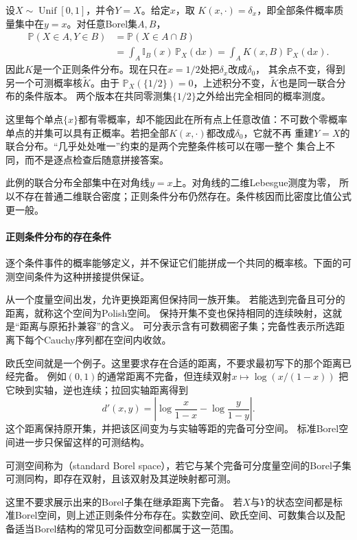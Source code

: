 \begin{example}[条件分布版本可以怎样不同]
\label{ex:probability-conditional-kernel-versions}
设\(X\sim\operatorname{Unif}[0,1]\)，并令\(Y=X\)。给定\(x\)，取
\(K(x,\cdot)=\delta_x\)，即全部条件概率质量集中在\(y=x\)。对任意Borel集\(A,B\)，
\[
 \begin{aligned}
 \mathbb P(X\in A,Y\in B)
 &=\mathbb P(X\in A\cap B)\\
 &=\int_A\mathbb I_B(x)\,\mathbb P_X(\mathrm dx)
  =\int_A K(x,B)\,\mathbb P_X(\mathrm dx).
 \end{aligned}
\]
因此\(K\)是一个正则条件分布。现在只在\(x=1/2\)处把\(\delta_x\)改成\(\delta_0\)，
其余点不变，得到另一个可测概率核\(\widetilde K\)。由于
\(\mathbb P_X(\{1/2\})=0\)，上述积分不变，\(\widetilde K\)也是同一联合分布的条件版本。
两个版本在共同零测集\(\{1/2\}\)之外给出完全相同的概率测度。

这里每个单点\(\{x\}\)都有零概率，却不能因此在所有点上任意改值：不可数个零概率
单点的并集可以具有正概率。若把全部\(K(x,\cdot)\)都改成\(\delta_0\)，它就不再
重建\(Y=X\)的联合分布。“几乎处处唯一”约束的是两个完整条件核可以在哪一整个
集合上不同，而不是逐点检查后随意拼接答案。

此例的联合分布全部集中在对角线\(y=x\)上。对角线的二维Lebesgue测度为零，
所以不存在普通二维联合密度；正则条件分布仍然存在。条件核因而比密度比值公式更一般。
\end{example}

\paragraph{正则条件分布的存在条件}
逐个条件事件的概率能够定义，并不保证它们能拼成一个共同的概率核。下面的可测空间条件为这种拼接提供保证。
\begin{definition}[Polish空间]
  \label{def:probability-polish-space}
从一个度量空间出发，允许更换距离但保持同一族开集。
若能选到完备且可分的距离，就称这个空间为Polish空间。
保持开集不变也保持相同的连续映射，这就是“距离与原拓扑兼容”的含义。
可分表示含有可数稠密子集；完备性表示所选距离下每个Cauchy序列都在空间内收敛。
\end{definition}
欧氏空间就是一个例子。这里要求存在合适的距离，不要求最初写下的那个距离已经完备。
例如\((0,1)\)的通常距离不完备，但连续双射\(x\mapsto\log(x/(1-x))\)
把它映到实轴，逆也连续；拉回实轴距离得到
\[
 d'(x,y)=\left|\log\frac{x}{1-x}-\log\frac{y}{1-y}\right|.
\]
这个距离保持原开集，并把该区间变为与实轴等距的完备可分空间。
标准Borel空间进一步只保留这样的可测结构。
\begin{definition}[标准Borel空间]
  \label{def:probability-standard-borel-space}
  可测空间称为（standard Borel space），若它与某个完备可分度量空间的Borel子集可测同构，即存在双射，且该双射及其逆映射都可测。
\end{definition}
这里不要求展示出来的Borel子集在继承距离下完备。
若\(X\)与\(Y\)的状态空间都是标准Borel空间，则上述正则条件分布存在。实数空间、欧氏空间、可数集合以及配备适当Borel结构的常见可分函数空间都属于这一范围。

